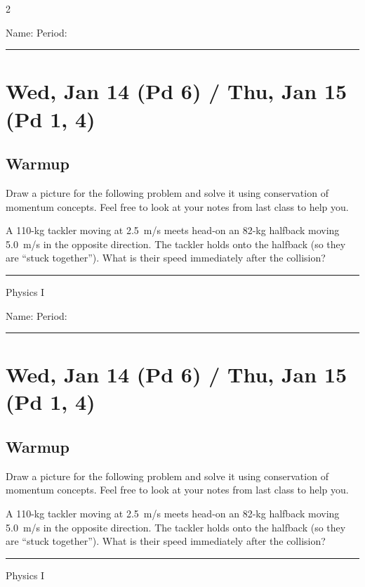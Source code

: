 \documentclass[10pt,landscape]{exam}
\def\todayDate{Wed, Jan 14 (Pd 6) / Thu, Jan 15 (Pd 1, 4)}
\def\content{

Draw a picture for the following problem and solve it using conservation of momentum concepts.  Feel free to look at your notes from last class to help you.

\vspace{2em}

\noindent
A 110-kg tackler moving at 2.5~m/s meets head-on an 82-kg halfback moving 5.0~m/s in the opposite direction.  The tackler holds onto the halfback (so they are ``stuck together'').  What is their speed immediately after the collision?
}
\begin{document}
\pagestyle{empty}

\setlength{\columnsep}{0.8in}
\begin{multicols*}{2}

\noindent  
Name: \hfill Period: \hspace{5em}
\vspace{0.5em}
\hrule

\section*{\todayDate}
\subsection*{Warmup}

\content

\vfill
\hrule
\vspace{0.5em}
\hfill {\sc Physics I}

\columnbreak

\noindent  
Name: \hfill Period: \hspace{5em}
\vspace{0.5em}
\hrule

\section*{\todayDate}
\subsection*{Warmup}

\content

\vfill
\hrule
\vspace{0.5em}
\hfill {\sc Physics I}

\end{multicols*}
\end{document}
